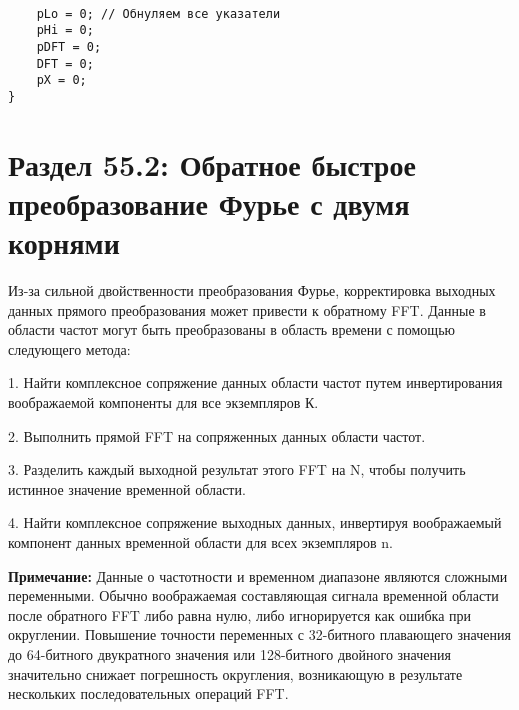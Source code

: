 
\begin{tcolorbox}
\begin{verbatim}

    pLo = 0; // Обнуляем все указатели
    pHi = 0;
    pDFT = 0;
    DFT = 0;
    pX = 0;
}

\end{verbatim}
\end{tcolorbox}

\section*{Раздел 55.2: Обратное быстрое преобразование Фурье с \newline двумя корнями}
Из-за сильной двойственности преобразования Фурье, корректировка выходных данных прямого преобразования может привести к обратному FFT. Данные в области частот могут быть преобразованы в область времени с помощью следующего метода:

\vspace{\baselineskip}
\hspace*{6mm}1.	Найти комплексное сопряжение данных области частот путем инвертирования \newline \hspace*{6mm}воображаемой компоненты для все экземпляров К.

\vspace{\baselineskip}
\hspace*{6mm}2.	Выполнить прямой FFT на сопряженных данных области частот.

\vspace{\baselineskip}
\hspace*{6mm}3.	Разделить каждый выходной результат этого FFT на N, чтобы получить истинное \newline \hspace*{6mm}значение временной области.

\vspace{\baselineskip}
\hspace{6mm}4.	Найти комплексное сопряжение выходных данных, инвертируя воображаемый компонент \newline \hspace*{6mm}данных временной области для всех экземпляров n.

\vspace{\baselineskip}
\textbf{Примечание:} Данные о частотности и временном диапазоне являются сложными переменными. Обычно воображаемая составляющая сигнала временной области после обратного FFT либо равна нулю, либо игнорируется как ошибка при округлении. Повышение точности переменных с 32-битного плавающего значения до 64-битного двукратного значения или 128-битного двойного значения значительно снижает погрешность округления, возникающую в результате нескольких последовательных операций FFT.

